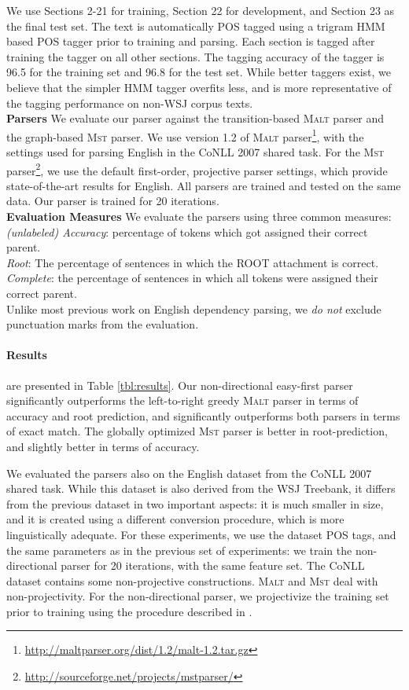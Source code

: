 \documentclass[11pt]{article}
\begin{document}
We use Sections 2-21 for training, Section 22 for development, and Section 23 as the final test set.
%
The text is automatically POS tagged using a trigram HMM based POS tagger prior to training and parsing.  Each section is tagged after training the tagger on all other sections.  The tagging accuracy of the tagger is 96.5 for the training set and 96.8 for the test set.  While better taggers exist, we believe that the simpler HMM tagger overfits less, and is more representative of the tagging performance on non-WSJ corpus texts.\\
\textbf{Parsers}
We evaluate our parser against the transition-based \textsc{Malt} parser and the graph-based \textsc{Mst} parser.  We use version 1.2 of \textsc{Malt} parser\footnote{\url{http://maltparser.org/dist/1.2/malt-1.2.tar.gz}}, with the settings used for parsing English in the CoNLL 2007 shared task.  For the \textsc{Mst} parser\footnote{\url{http://sourceforge.net/projects/mstparser/}}, we use the default first-order, projective parser settings, which provide state-of-the-art results for English.
All parsers are trained and tested on the same data.
Our parser is trained for 20 iterations.\\
\textbf{Evaluation Measures}
We evaluate the parsers using three common measures:\\
\textit{(unlabeled) Accuracy}: percentage of tokens which got assigned their correct parent. \\
\textit{Root}: The percentage of sentences in which the ROOT attachment is correct.\\
\textit{Complete}: the percentage of sentences in which all tokens were assigned their correct parent.\\
Unlike most previous work on English dependency parsing, we \textit{do not} exclude punctuation marks from the evaluation.

\paragraph{Results} are presented in Table \ref{tbl:results}.
Our non-directional easy-first parser significantly outperforms the left-to-right greedy \textsc{Malt} parser in terms of accuracy and root prediction, and significantly outperforms both parsers in terms of exact match.  The globally optimized \textsc{Mst} parser is better in root-prediction, and slightly better in terms of accuracy.  

We evaluated the parsers also on the English dataset from the CoNLL 2007 shared task.  While this dataset is also derived from the WSJ Treebank, it differs from the previous dataset in two important aspects: it is much smaller in size, and it is created using a different conversion procedure, which is more linguistically adequate.  For these experiments, we use the dataset POS tags, and the same parameters as in the previous set of experiments:  we train the non-directional parser for 20 iterations, with the same feature set.  The CoNLL dataset contains some non-projective constructions.  \textsc{Malt} and \textsc{Mst} deal with non-projectivity.  For the non-directional parser, we projectivize the training set prior to training using the procedure described in \cite{xavier}.
\end{document}
